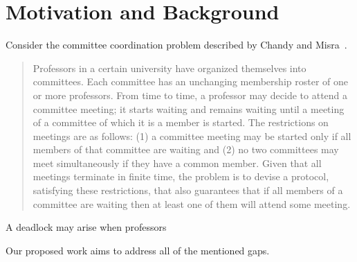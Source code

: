 \section{Motivation and Background}

Consider the committee coordination problem described by Chandy and Misra~\cite{MisraCommittee}. 

\begin{quote}
  Professors in a certain university
  have organized themselves into committees.
  Each committee has an unchanging membership
  roster of one or more professors. From
  time to time, a professor may decide to attend
  a committee meeting; it starts waiting
  and remains waiting until a meeting of a committee
  of which it is a member is started.
  The restrictions on meetings are as follows:
  (1) a committee meeting may be started only
  if all members of that committee are waiting
  and (2) no two committees may meet simultaneously
  if they have a common member. 
  Given that all meetings terminate in finite
  time, the problem is to devise a protocol,
  satisfying these restrictions, that also guarantees
  that if all members of a committee are
  waiting then at least one of them will attend
  some meeting.
\end{quote}

A deadlock may arise when professors 

Our proposed work aims to address all of the mentioned gaps. 


